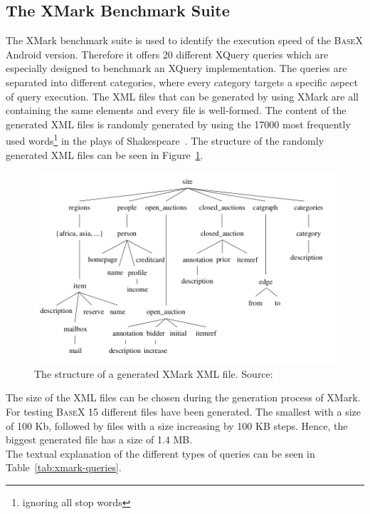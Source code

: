 \subsection{The XMark Benchmark Suite}
\label{subsec:the-xmark-benchmark-suite}
The XMark benchmark suite is used to identify the execution speed of the \textsc{BaseX} Android version.
Therefore it offers 20 different XQuery queries which are especially designed to benchmark an XQuery implementation.
The queries are separated into different categories, where every category targets a specific aspect of query execution.
The XML files that can be generated by using XMark are all containing the same elements and every file is well-formed.
The content of the generated XML files is randomly generated by using the 17000 most frequently used words\footnote{ignoring all stop words} in the plays of Shakespeare~\cite{schmidtxmark}.
The structure of the randomly generated XML files can be seen in Figure~\ref{fig:xmark-file-structure}.
\begin{figure}[htpb]
\begin{center}
\includegraphics[scale=0.42]{images/xmark-file-elements.png} 
\caption{The structure of a generated XMark XML file. Source:\cite{schmidtxmark}}
\label{fig:xmark-file-structure}
\end{center}
\end{figure}
\newpage
The size of the XML files can be chosen during the generation process of XMark.
For testing \textsc{BaseX} 15 different files have been generated.
The smallest with a size of 100 Kb, followed by files with a size increasing by 100 KB steps.
Hence, the biggest generated file has a size of 1.4 MB.\\
The textual explanation of the different types of queries can be seen in Table~\ref{tab:xmark-queries}.
